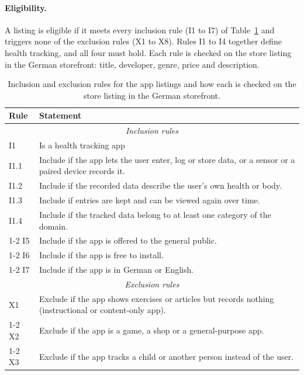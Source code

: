 \paragraph{Eligibility.} A listing is eligible if it meets every inclusion rule (I1 to I7) of
Table~\ref{tab:eligibility} and triggers none of the exclusion rules (X1 to X8). Rules I1 to I4
together define health tracking, and all four must hold. Each rule is checked on the store
listing in the German storefront: title, developer, genre, price and description.

\begin{table}[!t]
\centering
\begin{singlespace}
\small
\caption[Inclusion and exclusion rules for the app listings]{Inclusion and exclusion rules for
the app listings and how each is checked on the store listing in the German storefront.}
\label{tab:eligibility}
\begin{tabularx}{\textwidth}{@{}l>{\raggedright\arraybackslash}X@{}}
\toprule
\textbf{Rule} & \textbf{Statement} \\
\midrule
\multicolumn{2}{c}{\textit{Inclusion rules}} \\
\midrule
I1 & Is a health tracking app \\
\quad I1.1 & Include if the app lets the user enter, log or store data, or a sensor or a paired
  device records it. \\
\quad I1.2 & Include if the recorded data describe the user's own health or body. \\
\quad I1.3 & Include if entries are kept and can be viewed again over time. \\
\quad I1.4 & Include if the tracked data belong to at least one category of the domain. \\
\cmidrule[0.3pt]{1-2}
I5 & Include if the app is offered to the general public. \\
\cmidrule[0.3pt]{1-2}
I6 & Include if the app is free to install. \\
\cmidrule[0.3pt]{1-2}
I7 & Include if the app is in German or English. \\
\midrule
\multicolumn{2}{c}{\textit{Exclusion rules}} \\
\midrule
X1 & Exclude if the app shows exercises or articles but records nothing (instructional or
  content-only app). \\
\cmidrule[0.3pt]{1-2}
X2 & Exclude if the app is a game, a shop or a general-purpose app. \\
\cmidrule[0.3pt]{1-2}
X3 & Exclude if the app tracks a child or another person instead of the user. \\

\end{tabularx}
\end{singlespace}
\end{table}
